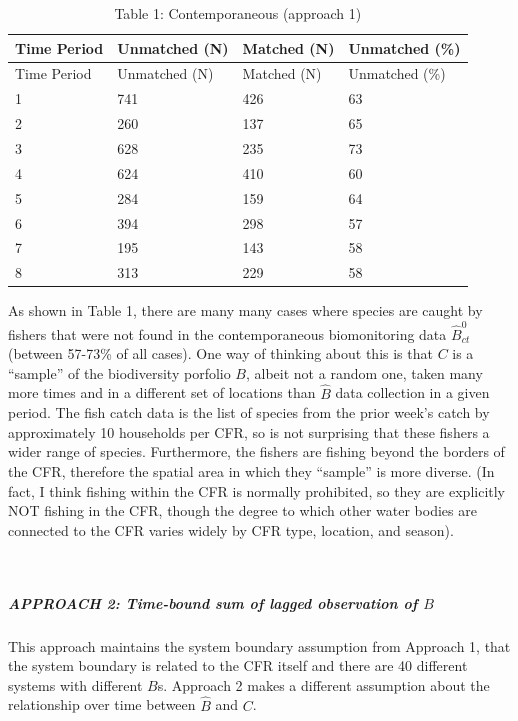 \documentclass[
]{article}
\begin{document}
\begin{longtable}[]{@{}llll@{}}
\caption{Table 1: Contemporaneous (approach 1)}\tabularnewline
\toprule
Time Period & Unmatched (N) & Matched (N) & Unmatched (\%) \\
\midrule
\endfirsthead
\toprule
Time Period & Unmatched (N) & Matched (N) & Unmatched (\%) \\
\midrule
\endhead
1 & 741 & 426 & 63 \\
2 & 260 & 137 & 65 \\
3 & 628 & 235 & 73 \\
4 & 624 & 410 & 60 \\
5 & 284 & 159 & 64 \\
6 & 394 & 298 & 57 \\
7 & 195 & 143 & 58 \\
8 & 313 & 229 & 58 \\
\bottomrule
\end{longtable}

As shown in Table 1, there are many many cases where species are caught
by fishers that were not found in the contemporaneous biomonitoring data
\(\hat{B}_{ct}^0\) (between 57-73\% of all cases). One way of thinking
about this is that \(C\) is a ``sample'' of the biodiversity porfolio
\(B\), albeit not a random one, taken many more times and in a different
set of locations than \(\hat{B}\) data collection in a given period. The
fish catch data is the list of species from the prior week's catch by
approximately 10 households per CFR, so is not surprising that these
fishers a wider range of species. Furthermore, the fishers are fishing
beyond the borders of the CFR, therefore the spatial area in which they
``sample'' is more diverse. (In fact, I think fishing within the CFR is
normally prohibited, so they are explicitly NOT fishing in the CFR,
though the degree to which other water bodies are connected to the CFR
varies widely by CFR type, location, and season).\\
\strut \\

\hypertarget{approach-2-time-bound-sum-of-lagged-observation-of-b}{%
\subparagraph{\texorpdfstring{\textbf{APPROACH 2: Time-bound sum of
lagged observation of
\(B\)}}{APPROACH 2: Time-bound sum of lagged observation of B}}\label{approach-2-time-bound-sum-of-lagged-observation-of-b}}

\hfill\break
\hfill\break
This approach maintains the system boundary assumption from Approach 1,
that the system boundary is related to the CFR itself and there are 40
different systems with different \(B\)s. Approach 2 makes a different
assumption about the relationship over time between \(\hat{B}\) and
\(C\).
\end{document}
